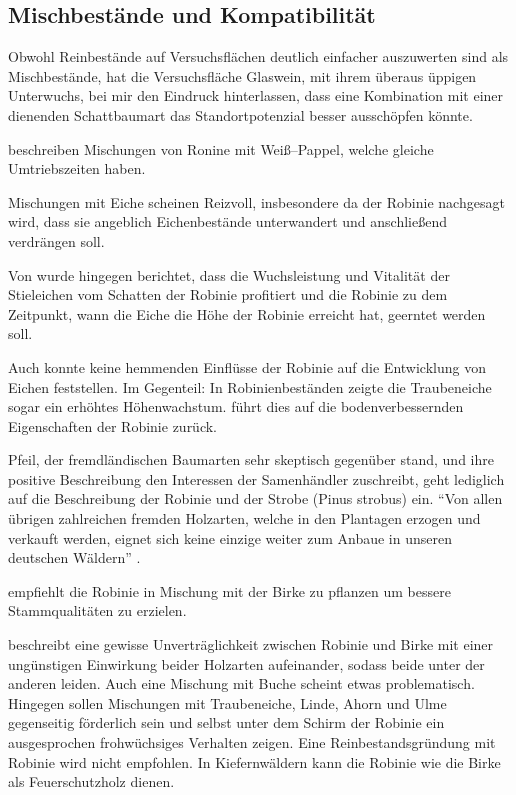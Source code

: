 \documentclass[twocolumn]{scrartcl}
\begin{document}
\subsection{Mischbestände und Kompatibilität}

Obwohl Reinbestände auf Versuchsflächen deutlich einfacher auszuwerten
sind als Mischbestände, hat die Versuchsfläche Glaswein, mit ihrem
überaus üppigen Unterwuchs, bei mir den Eindruck hinterlassen, dass
eine Kombination mit einer dienenden Schattbaumart das
Standortpotenzial besser ausschöpfen könnte.

\citet{redei2006robiniePappel} beschreiben Mischungen von Ronine mit
Weiß--Pappel, welche gleiche Umtriebszeiten haben.

Mischungen mit Eiche scheinen Reizvoll, insbesondere da der Robinie
nachgesagt wird, dass sie angeblich Eichenbestände unterwandert und
anschließend verdrängen soll.

Von \citet{kallina1888robinie} wurde hingegen berichtet, dass die
Wuchsleistung und Vitalität der Stieleichen vom Schatten der Robinie
profitiert und die Robinie zu dem Zeitpunkt, wann die Eiche die Höhe
der Robinie erreicht hat, geerntet werden soll.

Auch \citet{feher2024robinie} konnte keine hemmenden Einflüsse der
Robinie auf die Entwicklung von Eichen feststellen. Im Gegenteil: In
Robinienbeständen zeigte die Traubeneiche sogar ein erhöhtes
Höhenwachstum. \citet{foeldes1903robinie} führt dies auf die
bodenverbessernden Eigenschaften der Robinie zurück.

\citet[S.~174ff]{pfeil1829deutscheWaldbaeume} Pfeil, der
fremdländischen Baumarten sehr skeptisch gegenüber stand, und ihre
positive Beschreibung den Interessen der Samenhändler zuschreibt, geht
lediglich auf die Beschreibung der Robinie und der Strobe (Pinus
strobus) ein. \enquote{Von allen übrigen zahlreichen fremden
  Holzarten, welche in den Plantagen erzogen und verkauft werden,
  eignet sich keine einzige weiter zum Anbaue in unseren deutschen
  Wäldern} \citep{pfeil1860holzzucht}.

\citet{pfeil1850robinie} empfiehlt die Robinie in Mischung mit der
Birke zu pflanzen um bessere Stammqualitäten zu erzielen.

\citet[S.~88--96]{erteld1952robinieErtrag} beschreibt eine gewisse
Unverträglichkeit zwischen Robinie und Birke mit einer ungünstigen
Einwirkung beider Holzarten aufeinander, sodass beide unter der
anderen leiden. Auch eine Mischung mit Buche scheint etwas
problematisch. Hingegen sollen Mischungen mit Traubeneiche, Linde,
Ahorn und Ulme gegenseitig förderlich sein und selbst unter dem Schirm
der Robinie ein ausgesprochen frohwüchsiges Verhalten zeigen. Eine
Reinbestandsgründung mit Robinie wird nicht empfohlen. In
Kiefernwäldern kann die Robinie wie die Birke als Feuerschutzholz
dienen.
\end{document}
